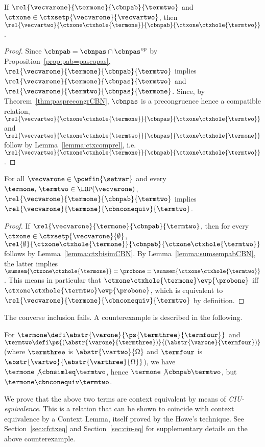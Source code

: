 \begin{lemma}\label{lemma:ctxbisimCBN}
  If $\rel{\vecvarone}{\termone}{\cbnpab}{\termtwo}$ and
  $\ctxone\in\ctxsetp{\vecvarone}{\vecvartwo}$, then
  $\rel{\vecvartwo}{\ctxone\ctxhole{\termone}}{\cbnpab}{\ctxone\ctxhole{\termtwo}}$.
\end{lemma}
\begin{proof}
  Since $\cbnpab = \cbnpas \cap \cbnpas^{\mathit{op}}$ by
  Proposition~\ref{prop:pab=pascopas},
  $\rel{\vecvarone}{\termone}{\cbnpab}{\termtwo}$ implies
  $\rel{\vecvarone}{\termone}{\cbnpas}{\termtwo}$ and
  $\rel{\vecvarone}{\termtwo}{\cbnpas}{\termone}$. Since, by
  Theorem~\ref{thm:pasprecongrCBN}, $\cbnpas$ is a precongruence hence a
  compatible relation,
  $\rel{\vecvartwo}{\ctxone\ctxhole{\termone}}{\cbnpas}{\ctxone\ctxhole{\termtwo}}$
  and
  $\rel{\vecvartwo}{\ctxone\ctxhole{\termtwo}}{\cbnpas}{\ctxone\ctxhole{\termone}}$
  follow by Lemma~\ref{lemma:ctxcomprel}, i.e. $\rel{\vecvartwo}{\ctxone\ctxhole{\termone}}{\cbnpab}{\ctxone\ctxhole{\termtwo}}$.
\end{proof}
\begin{theorem}\label{thm:pab_ce}
  For all $\vecvarone\in\powfin{\setvar}$ and every $\termone,\,
  \termtwo\in\LOP(\vecvarone)$,
  $\rel{\vecvarone}{\termone}{\cbnpab}{\termtwo}$ implies
  $\rel{\vecvarone}{\termone}{\cbnconequiv}{\termtwo}$.
\end{theorem}
\begin{proof}
  If $\rel{\vecvarone}{\termone}{\cbnpab}{\termtwo}$, then for every
  $\ctxone\in\ctxsetp{\vecvarone}{\emptyset}$,
  $\rel{\emptyset}{\ctxone\ctxhole{\termone}}{\cbnpab}{\ctxone\ctxhole{\termtwo}}$
  follows by Lemma~\ref{lemma:ctxbisimCBN}. By
  Lemma~\ref{lemma:sumsempabCBN}, the latter implies
  $\sumsem{\ctxone\ctxhole{\termone}}=\probone=\sumsem{\ctxone\ctxhole{\termtwo}}$. This
  means in particular that $\ctxone\ctxhole{\termone}\evp{\probone}$ iff
  $\ctxone\ctxhole{\termtwo}\evp{\probone}$, which is equivalent to
  $\rel{\vecvarone}{\termone}{\cbnconequiv}{\termtwo}$ by definition.
\end{proof}
The converse inclusion fails. A counterexample 
is described in the following.
\begin{example}\label{ex:count}
  For $\termone\defi\abstr{\varone}{\ps{\termthree}{\termfour}}$
  and $\termtwo\defi\ps{(\abstr{\varone}{\termthree})}{(\abstr{\varone}{\termfour})}$
  (where $\termthree$ is $\abstr{\vartwo}{\Omega}$ and $\termfour$ is $\abstr{\vartwo}{\abstr{\varthree}{\Omega}}$), 
  we have $\termone\not\cbnsimleq\termtwo$, hence
  $\termone\not\cbnpab\termtwo$, but
  $\termone\cbnconequiv\termtwo$.
\end{example}
We prove that the above two terms are context equivalent by means
of \emph{CIU-equivalence}. This is a relation that can be shown to
coincide with context equivalence by a Context Lemma, itself proved by the
Howe's technique.  See Section~\ref{sec:cfctxeq} and
Section~\ref{sec:ciu-eq} for supplementary details on the above
counterexample.  

